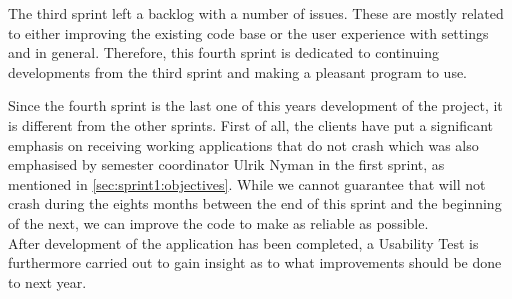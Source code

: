 The third sprint left a backlog with a number of issues.
These are mostly related to either improving the existing code base or the user experience with settings and \launcher in general.
Therefore, this fourth sprint is dedicated to continuing developments from the third sprint and making \launcher a pleasant program to use.

Since the fourth sprint is the last one of this years development of the project, it is different from the other sprints.
First of all, the clients have put a significant emphasis on receiving working applications that do not crash which was also emphasised by semester coordinator Ulrik Nyman in the first sprint, as mentioned in \cref{sec:sprint1:objectives}.
While we cannot guarantee that \launcher will not crash during the eights months between the end of this sprint and the beginning of the next, we can improve the code to make \launcher as reliable as possible.\\

After development of the application has been completed, a Usability Test is furthermore carried out to gain insight as to what improvements should be done to \launcher next year.